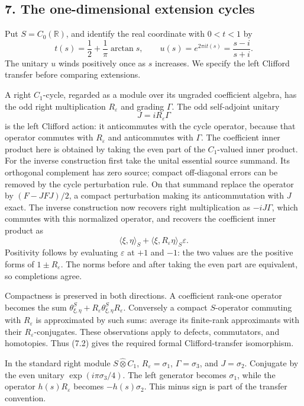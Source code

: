 \documentclass[
  11pt,
]{article}
\begin{document}
\subsection{7. The one-dimensional extension
cycles}\label{the-one-dimensional-extension-cycles}

Put \(S=C_0(\mathbb R)\), and identify the real coordinate with
\(0<t<1\) by \[
t(s)=\frac12+\frac1\pi\arctan s,\qquad
u(s)=e^{2\pi it(s)}=\frac{s-i}{s+i}.
\tag{7.1}
\] The unitary \(u\) winds positively once as \(s\) increases. We
specify the left Clifford transfer before comparing extensions.

A right \(C_1\)-cycle, regarded as a module over its ungraded
coefficient algebra, has the odd right multiplication \(R_\varepsilon\)
and grading \(\Gamma\). The odd self-adjoint unitary \[
J=iR_\varepsilon\Gamma
\tag{7.2}
\] is the left Clifford action: it anticommutes with the cycle operator,
because that operator commutes with \(R_\varepsilon\) and anticommutes
with \(\Gamma\). The coefficient inner product here is obtained by
taking the even part of the \(C_1\)-valued inner product. For the
inverse construction first take the unital essential source summand. Its
orthogonal complement has zero source; compact off-diagonal errors can
be removed by the cycle perturbation rule. On that summand replace the
operator by \((F-JFJ)/2\), a compact perturbation making its
anticommutation with \(J\) exact. The inverse construction now recovers
right multiplication as \(-iJ\Gamma\), which commutes with this
normalized operator, and recovers the coefficient inner product as \[
\langle\xi,\eta\rangle_S+
\langle\xi,R_\varepsilon\eta\rangle_S\varepsilon.
\] Positivity follows by evaluating \(\varepsilon\) at \(+1\) and
\(-1\): the two values are the positive forms of \(1\pm R_\varepsilon\).
The norms before and after taking the even part are equivalent, so
completions agree.

Compactness is preserved in both directions. A coefficient rank-one
operator becomes the sum
\(\theta_{\xi,\eta}^S+R_\varepsilon\theta_{\xi,\eta}^SR_\varepsilon\).
Conversely a compact \(S\)-operator commuting with \(R_\varepsilon\) is
approximated by such sums: average its finite-rank approximants with
their \(R_\varepsilon\)-conjugates. These observations apply to defects,
commutators, and homotopies. Thus (7.2) gives the required formal
Clifford-transfer isomorphism.

In the standard right module \(S\widehat\otimes C_1\),
\(R_\varepsilon=\sigma_1\), \(\Gamma=\sigma_3\), and \(J=\sigma_2\).
Conjugate by the even unitary \(\exp(i\pi\sigma_3/4)\). The left
generator becomes \(\sigma_1\), while the operator \(h(s)R_\varepsilon\)
becomes \(-h(s)\sigma_2\). This minus sign is part of the transfer
convention.
\end{document}
